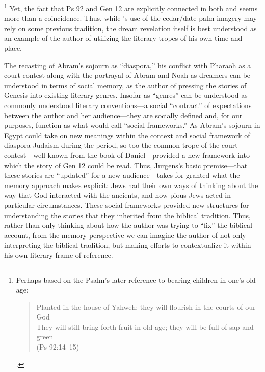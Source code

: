     \footnote{Perhaps based on the Psalm's later reference to bearing children in one's old age:
    \begin{quote}
        Planted in the house of Yahweh; they will flourish in the courts of our God\\
        They will still bring forth fruit in old age; they will be full of sap and green\\
        (Ps 92:14--15)
    \end{quote}.}
Yet, the fact that Ps 92 and Gen 12 are explicitly connected in both \ga and \GenRabbah seems more than a coincidence. Thus, while \ga's use of the cedar/date-palm imagery may rely on some previous tradition, the dream revelation itself is best understood as an example of the author of \ga utilizing the literary tropes of his own time and place. 




The recasting of Abram's sojourn as ``diaspora,'' his conflict with Pharaoh as a court-contest along with the portrayal of Abram and Noah as dreamers can be understood in terms of social memory, as the author of \ga pressing the stories of Genesis into existing literary genres. Insofar as ``genres'' can be understood as commonly understood literary conventions---a social ``contract'' of expectations between the author and her audience---they are socially defined and, for our purposes, function as what \halbwachs would call ``social frameworks.'' As Abram's sojourn in Egypt could take on new meanings within the context and social framework of diaspora Judaism during the \secondtemple period, so too the common trope of the court-contest---well-known from the book of Daniel---provided a new framework into which the story of Gen 12 could be read. Thus, Jurgens's basic premise---that these stories are ``updated'' for a new audience---takes for granted what the memory approach makes explicit: \secondtemple Jews had their own ways of thinking about the way that God interacted with the ancients, and how pious Jews acted in particular circumstances. These social frameworks provided new structures for understanding the stories that they inherited from the biblical tradition. Thus, rather than only thinking about how the author was trying to ``fix'' the biblical account, from the memory perspective we can imagine the author of \ga not only interpreting the biblical tradition, but making efforts to contextualize it within his own literary frame of reference.

